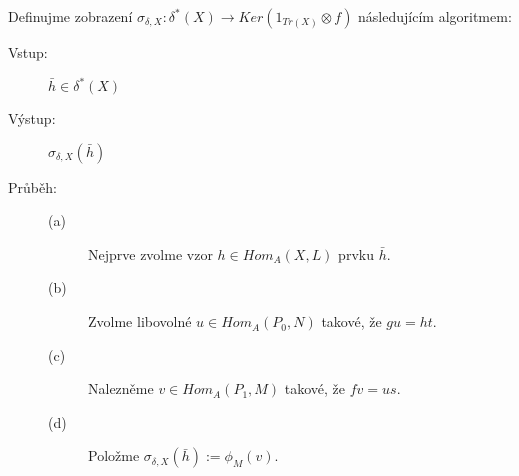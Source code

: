       \begin{dfn}
        Definujme zobrazení $\sigma_{\delta,X}:\delta^*(X)\rightarrow Ker(1_{Tr(X)}\otimes f)$ 
        následujícím algoritmem:     
        
        \begin{description}
          \item[\space\space\space Vstup:] $\bar{h}\in \delta^*(X)$
          
          \item[\space\space\space Výstup:] $\sigma_{\delta,X}(\bar{h})$
          
         \item[\space\space\space Průběh:] 
            \begin{description} 
               \item[]
               \item[(a)] Nejprve zvolme vzor $h\in Hom_A(X,L)$ prvku $\bar{h}$.
               \item[(b)] Zvolme libovolné $u\in Hom_A(P_0,N)$ takové, že $gu=ht$.
               \item[(c)] Nalezněme $v\in Hom_A(P_1,M)$ takové, že $fv=us$.
               \item[(d)] Položme $\sigma_{\delta,X}(\bar{h}):=\phi_M(v)$.
            \end{description}     
        \end{description}\,\,     
      \end{dfn}
      
